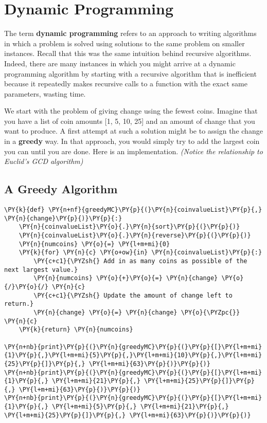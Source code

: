 \chapter{Dynamic Programming}


The term \textbf{dynamic programming} refers to an approach to writing algorithms in which a problem is solved using solutions to the same problem on smaller instances.
Recall that this was the same intuition behind recursive algorithms.
Indeed, there are many instances in which you might arrive at a dynamic programming algorithm by starting with a recursive algorithm that is inefficient because it repeatedly makes recursive calls to a function with the exact same parameters, wasting time.


We start with the problem of giving change using the fewest coins.  Imagine that you have a list of coin amounts [1, 5, 10, 25] and an amount of change that you want to produce.
A first attempt at such a solution might be to assign the change in a \textbf{greedy} way.
In that approach, you would simply try to add the largest coin you can until you are done.
Here is an implementation.  \emph{(Notice the relationship to Euclid's GCD algorithm)}

\section{A Greedy Algorithm}

\begin{Verbatim}[commandchars=\\\{\}]
\PY{k}{def} \PY{n+nf}{greedyMC}\PY{p}{(}\PY{n}{coinvalueList}\PY{p}{,} \PY{n}{change}\PY{p}{)}\PY{p}{:}
    \PY{n}{coinvalueList}\PY{o}{.}\PY{n}{sort}\PY{p}{(}\PY{p}{)}
    \PY{n}{coinvalueList}\PY{o}{.}\PY{n}{reverse}\PY{p}{(}\PY{p}{)}
    \PY{n}{numcoins} \PY{o}{=} \PY{l+m+mi}{0}
    \PY{k}{for} \PY{n}{c} \PY{o+ow}{in} \PY{n}{coinvalueList}\PY{p}{:}
        \PY{c+c1}{\PYZsh{} Add in as many coins as possible of the next largest value.}
        \PY{n}{numcoins} \PY{o}{+}\PY{o}{=} \PY{n}{change} \PY{o}{/}\PY{o}{/} \PY{n}{c}
        \PY{c+c1}{\PYZsh{} Update the amount of change left to return.}
        \PY{n}{change} \PY{o}{=} \PY{n}{change} \PY{o}{\PYZpc{}} \PY{n}{c}
    \PY{k}{return} \PY{n}{numcoins}

\PY{n+nb}{print}\PY{p}{(}\PY{n}{greedyMC}\PY{p}{(}\PY{p}{[}\PY{l+m+mi}{1}\PY{p}{,}\PY{l+m+mi}{5}\PY{p}{,}\PY{l+m+mi}{10}\PY{p}{,}\PY{l+m+mi}{25}\PY{p}{]}\PY{p}{,} \PY{l+m+mi}{63}\PY{p}{)}\PY{p}{)}
\PY{n+nb}{print}\PY{p}{(}\PY{n}{greedyMC}\PY{p}{(}\PY{p}{[}\PY{l+m+mi}{1}\PY{p}{,} \PY{l+m+mi}{21}\PY{p}{,} \PY{l+m+mi}{25}\PY{p}{]}\PY{p}{,} \PY{l+m+mi}{63}\PY{p}{)}\PY{p}{)}
\PY{n+nb}{print}\PY{p}{(}\PY{n}{greedyMC}\PY{p}{(}\PY{p}{[}\PY{l+m+mi}{1}\PY{p}{,} \PY{l+m+mi}{5}\PY{p}{,} \PY{l+m+mi}{21}\PY{p}{,} \PY{l+m+mi}{25}\PY{p}{]}\PY{p}{,} \PY{l+m+mi}{63}\PY{p}{)}\PY{p}{)}
\end{Verbatim}



